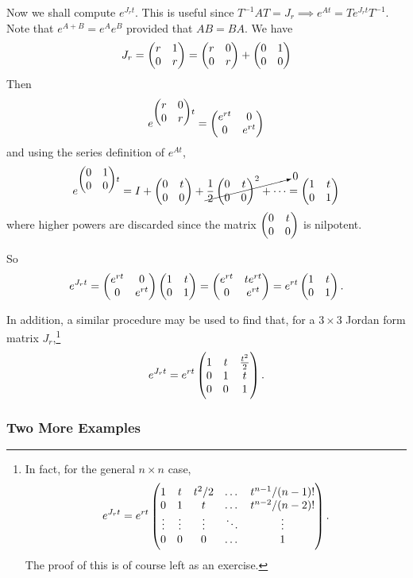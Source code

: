 Now we shall compute $e^{J_rt}$. This is useful since $T^{-1}AT = J_r \implies e^{At} = Te^{J_rt}T^{-1}$. Note that $e^{A+B} = e^A e^B$ provided that $AB = BA$. We have
\[
J_r = \begin{pmatrix}r & 1 \\ 0 & r\end{pmatrix} = \begin{pmatrix}r & 0 \\ 0 & r\end{pmatrix} + \begin{pmatrix}0 & 1 \\ 0 & 0\end{pmatrix}
\]
Then
\[
e^{\begin{pmatrix}r & 0 \\ 0 & r\end{pmatrix}t} = \begin{pmatrix}e^{rt} & 0 \\ 0 & e^{rt}\end{pmatrix}
\]
and using the series definition of $e^{At}$,
\[
e^{\begin{pmatrix}0 & 1 \\ 0 & 0\end{pmatrix}t} = I + \begin{pmatrix}0 & t \\ 0 & 0\end{pmatrix} + \cancelto{0}{\frac12\begin{pmatrix}0 & t \\ 0 & 0\end{pmatrix}^2 + \cdots} = \begin{pmatrix}1 & t \\ 0 & 1\end{pmatrix}
\]
where higher powers are discarded since the matrix $\begin{pmatrix}0 & t \\ 0 & 0\end{pmatrix}$ is nilpotent.

So
\[
e^{J_rt} = \begin{pmatrix}e^{rt} & 0 \\ 0 & e^{rt}\end{pmatrix} \begin{pmatrix}1 & t \\ 0 & 1\end{pmatrix} = \begin{pmatrix}e^{rt} & te^{rt} \\ 0 & e^{rt}\end{pmatrix} = e^{rt} \begin{pmatrix}1 & t \\ 0 & 1\end{pmatrix}.
\]

In addition, a similar procedure may be used to find that, for a $3 \times 3$ Jordan form matrix $J_r$,\footnote{In fact, for the general $n \times n$ case, \[e^{J_rt} = e^{rt}\begin{pmatrix}1 & t & t^2/2 & \dots & t^{n-1}/(n-1)! \\ 0 & 1 & t & \dots & t^{n-2}/(n-2)! \\ \vdots & \vdots & \vdots & \ddots & \vdots \\ 0 & 0 & 0 & \dots & 1\end{pmatrix}.\] The proof of this is of course left as an exercise.}
\[
e^{J_rt} = e^{rt} \begin{pmatrix}1 & t & \frac{t^2}{2} \\ 0 & 1 & t \\ 0 & 0 & 1\end{pmatrix}.
\]


\subsubsection{Two More Examples}

